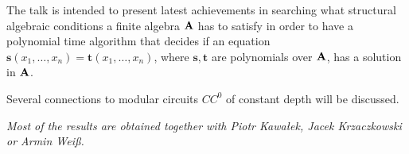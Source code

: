\documentclass[bsl,meeting]{asl}
\def\urladdr#1{\endgraf\noindent{\it URL Address}: {\tt #1}.}
\newcommand{\NP}{}
\begin{document}
\thispagestyle{empty}


\NP%
%
%
%
%

\newcommand{\m}[1]{{\uppercase {\mathbf{#1}}}}
\newcommand{\po}[1]{{\mathbf{#1}}}

\bigskip
The talk is intended to present latest achievements in searching what structural algebraic conditions a finite algebra $\m A$ has to satisfy in order to have a polynomial time algorithm that decides if an equation $\po s( x_1,\ldots,x_n) = \po t(x_1,\ldots,x_n)$, where $\po s, \po t$ are polynomials over $\m A$, has a solution in $\m A$.

Several connections to modular circuits $CC^0$ of constant depth will be discussed.

\medskip
\noindent
{\em Most of the results are obtained together with Piotr Kawałek, Jacek Krzaczkowski or Armin Wei{\ss}.}
\end{document}
